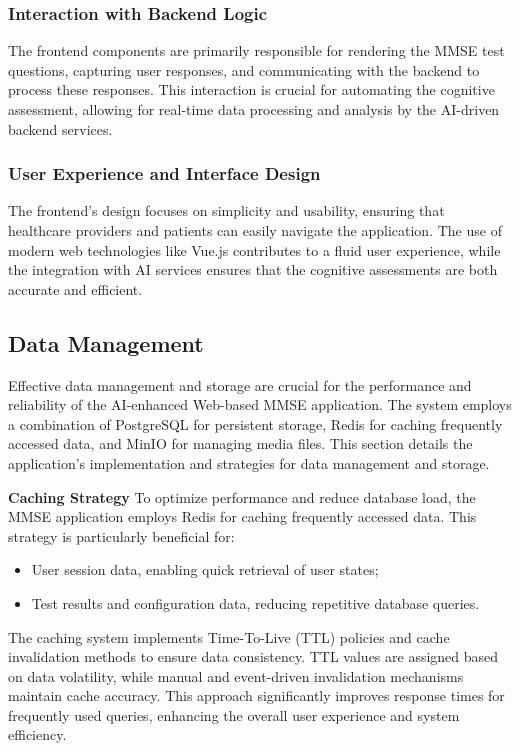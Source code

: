 \subsubsection{Interaction with Backend Logic}
The frontend components are primarily responsible for rendering the MMSE test questions, capturing user responses, and communicating with the backend to process these responses. This interaction is crucial for automating the cognitive assessment, allowing for real-time data processing and analysis by the AI-driven backend services.

\subsubsection{User Experience and Interface Design}
The frontend's design focuses on simplicity and usability, ensuring that healthcare providers and patients can easily navigate the application. The use of modern web technologies like Vue.js contributes to a fluid user experience, while the integration with AI services ensures that the cognitive assessments are both accurate and efficient.

\subsection{Data Management}
Effective data management and storage are crucial for the performance and reliability of the AI-enhanced Web-based MMSE application. The system employs a combination of PostgreSQL for persistent storage, Redis for caching frequently accessed data, and MinIO for managing media files. This section details the application's implementation and strategies for data management and storage.

\textbf{Caching Strategy}
To optimize performance and reduce database load, the MMSE application employs Redis for caching frequently accessed data. This strategy is particularly beneficial for:
\begin{itemize}
\item User session data, enabling quick retrieval of user states;
\item Test results and configuration data, reducing repetitive database queries.
\end{itemize}
The caching system implements Time-To-Live (TTL) policies and cache invalidation methods to ensure data consistency. TTL values are assigned based on data volatility, while manual and event-driven invalidation mechanisms maintain cache accuracy.
This approach significantly improves response times for frequently used queries, enhancing the overall user experience and system efficiency.

